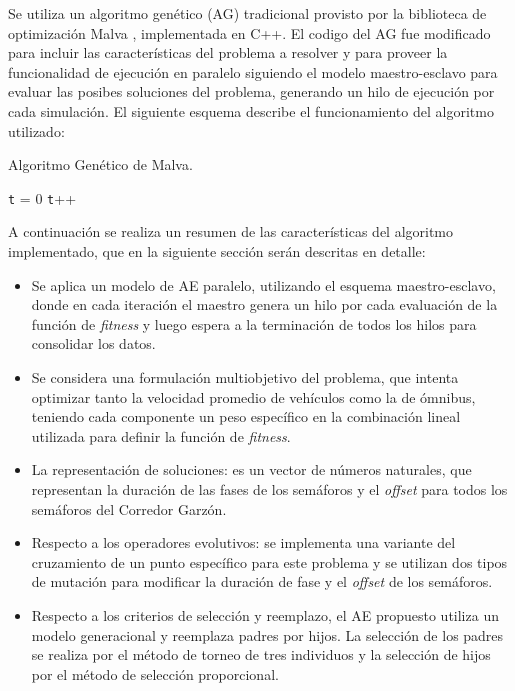 Se utiliza un algoritmo genético (AG) tradicional \citep{Goldberg1989} provisto por la biblioteca de optimización Malva \citep{Malva}, implementada en C++. El codigo del AG fue modificado para incluir las características del problema a resolver y para proveer la funcionalidad de ejecución en paralelo siguiendo el modelo maestro-esclavo para evaluar
las posibes soluciones del problema, generando un hilo de ejecución por cada simulación. El siguiente esquema describe el funcionamiento del algoritmo utilizado:

\begin{algorithm}[H]
	\caption{Algoritmo Genético de Malva. }
	\label{alg:algoritmo_genetico_malva}
	\begin{algorithmic} [1] 
		{
			\STATE \texttt{t} = 0
			\STATE \texttt{t}++		
			\ENDWHILE
		}
	\end{algorithmic}
	
\end{algorithm}

A continuación se realiza un resumen de las características del algoritmo implementado, que en la siguiente sección serán descritas en detalle:
\begin{itemize}
	
	\item Se aplica un modelo de AE paralelo, utilizando el esquema maestro-esclavo, donde en cada iteración el maestro genera un hilo por cada evaluación de la función de \emph{fitness} y luego espera a la terminación de todos los hilos para consolidar los datos. 
	\item Se considera una formulación multiobjetivo del problema, que intenta optimizar tanto la velocidad promedio de vehículos como la de ómnibus, teniendo cada componente un peso específico en la combinación lineal utilizada para definir la función de \emph{fitness}.
	\item La representación de soluciones: es un vector de números naturales, que representan la duración de las fases de los semáforos y el \emph{offset} para todos los semáforos del Corredor Garzón.
	\item Respecto a los operadores evolutivos: se implementa una variante del cruzamiento de un punto específico para este problema y se utilizan dos tipos de mutación para modificar la duración de fase y el \emph{offset} de los semáforos.
	\item Respecto a los criterios de selección y reemplazo, el AE propuesto utiliza un modelo generacional y reemplaza padres por hijos. La selección de los padres se realiza por el método de torneo de tres individuos y la selección de hijos por el método de selección proporcional.
	
\end{itemize}

